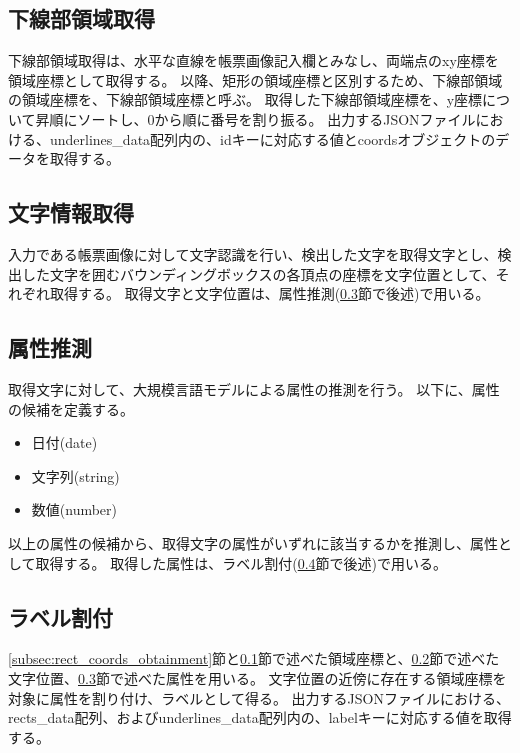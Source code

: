 \subsection{下線部領域取得}\label{subsec:underline_coords_obtainment}
下線部領域取得は、水平な直線を帳票画像記入欄とみなし、両端点のxy座標を領域座標として取得する。
以降、矩形の領域座標と区別するため、下線部領域の領域座標を、下線部領域座標と呼ぶ。
取得した下線部領域座標を、y座標について昇順にソートし、0から順に番号を割り振る。
出力するJSONファイルにおける、underlines\_data配列内の、idキーに対応する値とcoordsオブジェクトのデータを取得する。

\subsection{文字情報取得}\label{subsec:char_information_obtainment}
入力である帳票画像に対して文字認識を行い、検出した文字を取得文字とし、検出した文字を囲むバウンディングボックスの各頂点の座標を文字位置として、それぞれ取得する。
取得文字と文字位置は、属性推測(\ref{subsec:att_prediction}節で後述)で用いる。

\subsection{属性推測}\label{subsec:att_prediction}
取得文字に対して、大規模言語モデルによる属性の推測を行う。
以下に、属性の候補を定義する。

\begin{itemize}
    \item 日付(date)
    \item 文字列(string)
    \item 数値(number)
\end{itemize}

以上の属性の候補から、取得文字の属性がいずれに該当するかを推測し、属性として取得する。
取得した属性は、ラベル割付(\ref{subsec:label_link}節で後述)で用いる。

\subsection{ラベル割付}\label{subsec:label_link}
\ref{subsec:rect_coords_obtainment}節と\ref{subsec:underline_coords_obtainment}節で述べた領域座標と、\ref{subsec:char_information_obtainment}節で述べた文字位置、\ref{subsec:att_prediction}節で述べた属性を用いる。
文字位置の近傍に存在する領域座標を対象に属性を割り付け、ラベルとして得る。
出力するJSONファイルにおける、rects\_data配列、およびunderlines\_data配列内の、labelキーに対応する値を取得する。

